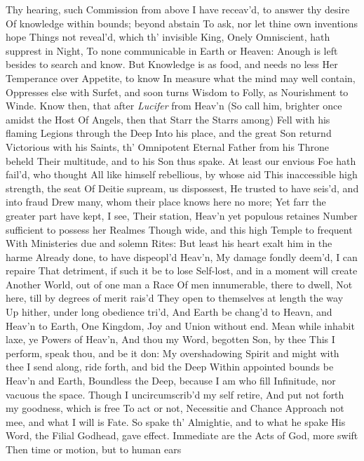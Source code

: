 \documentclass[11pt]{book}
\begin{document}
Thy hearing, such Commission from above 
I have receav'd, to answer thy desire 
Of knowledge within bounds; beyond abstain 
To ask, nor let thine own inventions hope 
Things not reveal'd, which th' invisible King, 
Onely Omniscient, hath supprest in Night, 
To none communicable in Earth or Heaven: 
Anough is left besides to search and know. 
But Knowledge is as food, and needs no less 
Her Temperance over Appetite, to know 
In measure what the mind may well contain, 
Oppresses else with Surfet, and soon turns 
Wisdom to Folly, as Nourishment to Winde. 
\quad Know then, that after \textit{Lucifer} from Heav'n 
(So call him, brighter once amidst the Host 
Of Angels, then that Starr the Starrs among) 
Fell with his flaming Legions through the Deep 
Into his place, and the great Son returnd 
Victorious with his Saints, th' Omnipotent 
Eternal Father from his Throne beheld 
Their multitude, and to his Son thus spake. 
\quad At least our envious Foe hath fail'd, who thought 
All like himself rebellious, by whose aid 
This inaccessible high strength, the seat 
Of Deitie supream, us dispossest, 
He trusted to have seis'd, and into fraud 
Drew many, whom their place knows here no more; 
Yet farr the greater part have kept, I see, 
Their station, Heav'n yet populous retaines 
Number sufficient to possess her Realmes 
Though wide, and this high Temple to frequent 
With Ministeries due and solemn Rites: 
But least his heart exalt him in the harme 
Already done, to have dispeopl'd Heav'n, 
My damage fondly deem'd, I can repaire 
That detriment, if such it be to lose 
Self-lost, and in a moment will create 
Another World, out of one man a Race 
Of men innumerable, there to dwell, 
Not here, till by degrees of merit rais'd 
They open to themselves at length the way 
Up hither, under long obedience tri'd, 
And Earth be chang'd to Heavn, and Heav'n to Earth, 
One Kingdom, Joy and Union without end. 
Mean while inhabit laxe, ye Powers of Heav'n, 
And thou my Word, begotten Son, by thee 
This I perform, speak thou, and be it don: 
My overshadowing Spirit and might with thee 
I send along, ride forth, and bid the Deep 
Within appointed bounds be Heav'n and Earth, 
Boundless the Deep, because I am who fill 
Infinitude, nor vacuous the space. 
Though I uncircumscrib'd my self retire, 
And put not forth my goodness, which is free 
To act or not, Necessitie and Chance 
Approach not mee, and what I will is Fate. 
\quad So spake th' Almightie, and to what he spake 
His Word, the Filial Godhead, gave effect. 
Immediate are the Acts of God, more swift 
Then time or motion, but to human ears 
\end{document}
